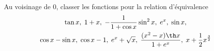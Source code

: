 Au voisinage de $0$, classer les fonctions pour la relation d'{\'e}quivalence
\begin{multline*}
\tan x,\; 1+x,\; -\frac{1}{1+\cos x}\sin ^{2}x,\; e^{x},\; \sin x,\\
 \cos x-\sin x,\; \cos x-1,\;
e^{x}+\sqrt{x},\; \frac{(x^{2}-x)\th x}{1+e^{x}},\; x+\frac{1}{2}x^{\frac{3}{2}}
\end{multline*}
\bigskip \bigskip \bigskip \bigskip